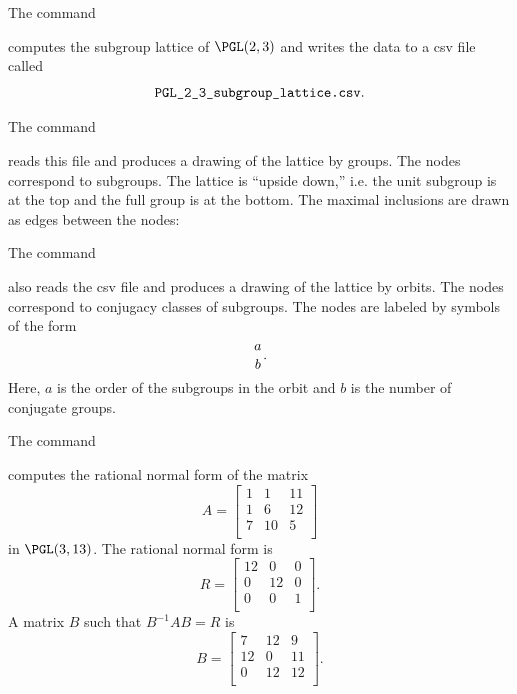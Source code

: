 \bigskip




The command


computes the subgroup lattice of 
$\PGL(2,3)$ and writes the data to a csv file called 
$$
\verb'PGL_2_3_subgroup_lattice.csv'.
$$

The command


reads this file and produces a drawing of the lattice by groups. 
The nodes correspond to subgroups. 
The lattice is ``upside down,'' 
i.e. the unit subgroup is at the top and the full group is at the bottom. 
The maximal inclusions are drawn as edges between the nodes:



\bigskip


The command


also reads the csv file and produces a drawing of the lattice by orbits. 
The nodes correspond to conjugacy classes of subgroups. 
The nodes are labeled by symbols of the form  
$$
{a \atop b}.
$$
Here, $a$ is the order of the subgroups 
in the orbit and $b$ is the number of conjugate groups.  



\bigskip

The command


computes the rational normal form of the matrix
$$
A=\left[
\begin{array}{ccc}
1 & 1 & 11\\
1 & 6 & 12\\
7 & 10 & 5\\
\end{array}
\right]
$$
in $\PGL(3,13)$.
The rational normal form is 
$$
R = \left[
\begin{array}{ccc}
12 & 0 & 0\\
0 & 12 & 0\\
0 & 0 & 1\\
\end{array}
\right].
$$
A matrix $B$ such that $B^{-1}AB=R$ is 
$$
B = \left[
\begin{array}{ccc}
7 & 12 & 9\\
12 & 0 & 11\\
0 & 12 & 12\\
\end{array}
\right].
$$

\bigskip


